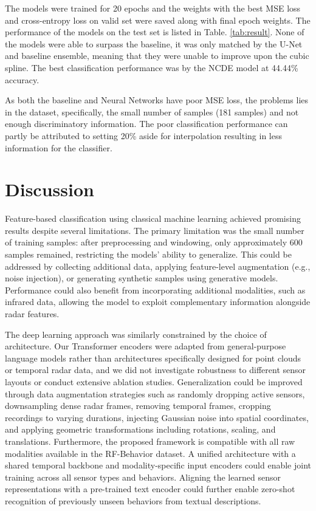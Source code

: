\documentclass{article}
\begin{document}
The models were trained for 20 epochs and the weights with the best MSE loss and cross-entropy loss on valid set were saved along with final epoch weights. The performance of the models on the test set is listed in Table. \ref{tab:result}. None of the models were able to surpass the baseline, it was only matched by the U-Net and baseline ensemble, meaning that they were unable to improve upon the cubic spline. The best classification performance was by the NCDE model at 44.44\% accuracy.

As both the baseline and Neural Networks have poor MSE loss, the problems lies in the dataset, specifically, the small number of samples (181 samples) and not enough discriminatory information. The poor classification performance can partly be attributed to setting 20\% aside for interpolation resulting in less information for the classifier.

\section{Discussion}
Feature-based classification using classical machine learning achieved promising results despite several limitations. The primary limitation was the small number of training samples: after preprocessing and windowing, only approximately 600 samples remained, restricting the models' ability to generalize. This could be addressed by collecting additional data, applying feature-level augmentation (e.g., noise injection), or generating synthetic samples using generative models. Performance could also benefit from incorporating additional modalities, such as infrared data, allowing the model to exploit complementary information alongside radar features.

The deep learning approach was similarly constrained by the choice of architecture. Our Transformer encoders were adapted from general-purpose language models rather than architectures specifically designed for point clouds or temporal radar data, and we did not investigate robustness to different sensor layouts or conduct extensive ablation studies. Generalization could be improved through data augmentation strategies such as randomly dropping active sensors, downsampling dense radar frames, removing temporal frames, cropping recordings to varying durations, injecting Gaussian noise into spatial coordinates, and applying geometric transformations including rotations, scaling, and translations. Furthermore, the proposed framework is compatible with all raw modalities available in the RF-Behavior dataset. A unified architecture with a shared temporal backbone and modality-specific input encoders could enable joint training across all sensor types and behaviors. Aligning the learned sensor representations with a pre-trained text encoder could further enable zero-shot recognition of previously unseen behaviors from textual descriptions.
\end{document}
